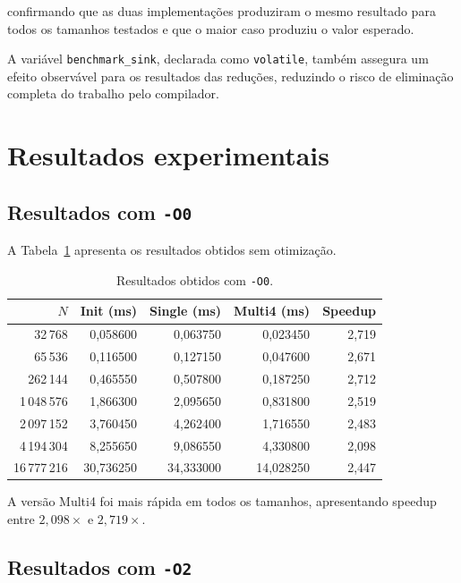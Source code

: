 confirmando que as duas implementações produziram o mesmo resultado para todos os tamanhos
testados e que o maior caso produziu o valor esperado.

A variável \texttt{benchmark\_sink}, declarada como \texttt{volatile}, também assegura um
efeito observável para os resultados das reduções, reduzindo o risco de eliminação completa
do trabalho pelo compilador.


\section{Resultados experimentais}

\label{sec:atvd02-resultados}

\subsection{Resultados com \texttt{-O0}}

A Tabela~\ref{tab:atvd02-o0} apresenta os resultados obtidos sem otimização.

\begin{table}[htbp]
\centering
\caption{Resultados obtidos com \texttt{-O0}.}
\label{tab:atvd02-o0}
\small
\begin{tabular}{r|r|r|r|r}
\hline
\(N\) & Init (ms) & Single (ms) & Multi4 (ms) & Speedup \\
\hline
32\,768      & 0,058600 & 0,063750 & 0,023450 & 2,719 \\
65\,536      & 0,116500 & 0,127150 & 0,047600 & 2,671 \\
262\,144     & 0,465550 & 0,507800 & 0,187250 & 2,712 \\
1\,048\,576  & 1,866300 & 2,095650 & 0,831800 & 2,519 \\
2\,097\,152  & 3,760450 & 4,262400 & 1,716550 & 2,483 \\
4\,194\,304  & 8,255650 & 9,086550 & 4,330800 & 2,098 \\
16\,777\,216 & 30,736250 & 34,333000 & 14,028250 & 2,447 \\
\hline
\end{tabular}
\end{table}

A versão Multi4 foi mais rápida em todos os tamanhos, apresentando speedup entre
\(2{,}098\times\) e \(2{,}719\times\).


\subsection{Resultados com \texttt{-O2}}

